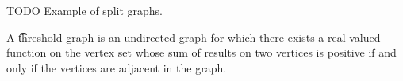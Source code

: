 

TODO
Example of split graphs.


A \t{threshold graph} is an undirected graph for which there exists a real-valued function on the vertex set whose sum of results on two vertices is positive if and only if the vertices are adjacent in the graph.
